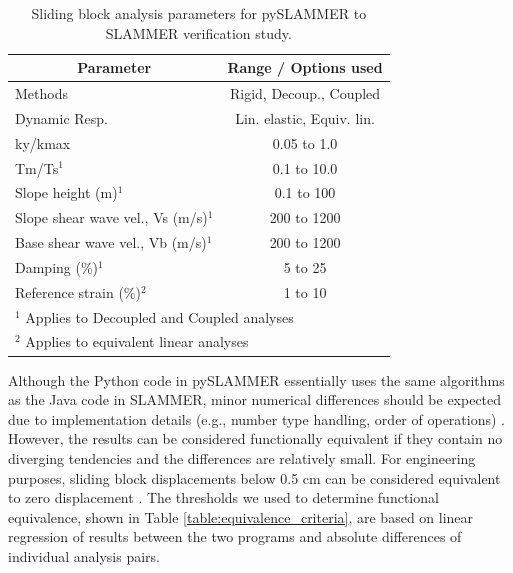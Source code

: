 \documentclass[preprint,review,12pt]{elsarticle}
\begin{document}
\begin{table}
\caption{Sliding block analysis parameters for pySLAMMER to SLAMMER verification study.}
\label{table:parametric_space}
\centering
\small
\renewcommand{\arraystretch}{1.25}
\begin{tabular}{l c}
\hline\hline
\multicolumn{1}{c}{Parameter} &
\multicolumn{1}{c}{Range / Options used} \\
\hline
Methods	& Rigid, Decoup., Coupled\\
Dynamic Resp. & Lin. elastic, Equiv. lin.\\
ky/kmax	& 0.05 to 1.0\\
Tm/Ts$^1$ &	0.1 to 10.0\\
Slope height (m)$^1$	& 0.1 to 100\\
Slope shear wave vel., Vs (m/s)$^1$ & 200 to 1200\\
Base shear wave vel., Vb (m/s)$^1$ & 200 to 1200\\
Damping (\%)$^1$	& 5 to 25\\
Reference strain (\%)$^2$	& 1 to 10\\
\hline
\multicolumn{2}{l}{$^1$ Applies to Decoupled and Coupled analyses} \\
\multicolumn{2}{l}{$^2$ Applies to equivalent linear analyses} \\
\hline\hline
\end{tabular}
\normalsize
\end{table}

Although the Python code in pySLAMMER essentially uses the same algorithms as the Java code in SLAMMER, minor numerical differences should be expected due to implementation details (e.g., number type handling, order of operations) \citep{ince_case_2012}.
However, the results can be considered functionally equivalent if they contain no diverging tendencies and the differences are relatively small.
For engineering purposes, sliding block displacements below 0.5 cm can be considered equivalent to zero displacement \citep{bray_procedure_2019}.
The thresholds we used to determine functional equivalence, shown in Table \ref{table:equivalence_criteria}, are based on linear regression of results between the two programs and absolute differences of individual analysis pairs.
\end{document}
